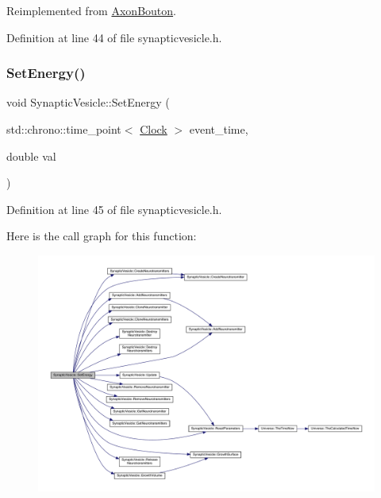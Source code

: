 Reimplemented from \hyperlink{class_axon_bouton_afe285478d414f2815afb98abe7b92898}{Axon\+Bouton}.



Definition at line 44 of file synapticvesicle.\+h.

\mbox{\label{class_synaptic_vesicle_ac98f9c8ccaabbccc38151c51d204dfec}} 
\subsubsection{\texorpdfstring{Set\+Energy()}{SetEnergy()}}
{\footnotesize\ttfamily void Synaptic\+Vesicle\+::\+Set\+Energy (\begin{DoxyParamCaption}\item[{std\+::chrono\+::time\+\_\+point$<$ \hyperlink{universe_8h_a0ef8d951d1ca5ab3cfaf7ab4c7a6fd80}{Clock} $>$}]{event\+\_\+time,  }\item[{double}]{val }\end{DoxyParamCaption})\hspace{0.3cm}{\ttfamily [inline]}}



Definition at line 45 of file synapticvesicle.\+h.

Here is the call graph for this function\+:
\nopagebreak
\begin{figure}[H]
\begin{center}
\leavevmode
\includegraphics[width=350pt]{class_synaptic_vesicle_ac98f9c8ccaabbccc38151c51d204dfec_cgraph}
\end{center}
\end{figure}
\mbox{\label{class_synaptic_vesicle_a49c8e82147e634c83f7b4c3ef9894e2d}} 
